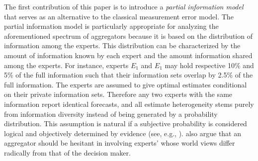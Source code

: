 \documentclass[11pt,twoside]{article}
\theoremstyle{definition}
\theoremstyle{definition}
\begin{document}
The first contribution of this paper is to introduce a \textit{partial information model} that serves as an alternative to the classical measurement error model. The partial information model is particularly appropriate for analyzing the aforementioned spectrum of aggregators because it is based on the distribution of information among the experts. This distribution can be characterized by the amount of information known by each expert and the amount information shared among the experts. For instance,   experts $E_1$ and $E_1$ may hold respective 10\% and 5\%  of the full information such that their information sets overlap by 2.5\% of the full information. The experts are assumed to give optimal estimates conditional on their private information sets. Therefore any two experts with the same information  report identical forecasts, and all estimate heterogeneity stems purely from information diversity instead of being generated by a probability distribution. This assumption is natural if a subjective probability is considered logical and objectively determined by evidence (see, e.g., \cite{carnap1962logical, jeffreys1998theory, keynes2004treatise}). \cite{dawid1995coherent} also argue that an aggregator should be hesitant in involving experts' whose world views differ radically from that of the decision maker. 
\end{document}
